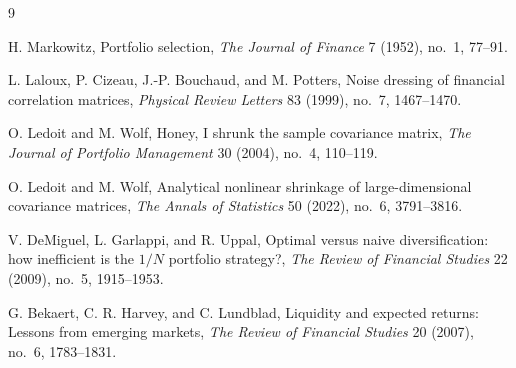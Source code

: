 \documentclass[11pt]{article}
\begin{document}
\begin{thebibliography}{9}
\small

H. Markowitz, Portfolio selection, \textit{The Journal of Finance} 7 (1952),
no.~1, 77--91.

L. Laloux, P. Cizeau, J.-P. Bouchaud, and M. Potters, Noise dressing of
financial correlation matrices, \textit{Physical Review Letters} 83 (1999),
no.~7, 1467--1470.

O. Ledoit and M. Wolf, Honey, I shrunk the sample covariance matrix,
\textit{The Journal of Portfolio Management} 30 (2004), no.~4, 110--119.

O. Ledoit and M. Wolf, Analytical nonlinear shrinkage of large-dimensional
covariance matrices, \textit{The Annals of Statistics} 50 (2022), no.~6,
3791--3816.

V. DeMiguel, L. Garlappi, and R. Uppal, Optimal versus naive diversification:
how inefficient is the $1/N$ portfolio strategy?, \textit{The Review of
Financial Studies} 22 (2009), no.~5, 1915--1953.

G. Bekaert, C. R. Harvey, and C. Lundblad, Liquidity and expected returns:
Lessons from emerging markets, \textit{The Review of Financial Studies} 20
(2007), no.~6, 1783--1831.

\end{thebibliography}
\end{document}
